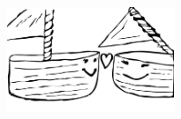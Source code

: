 \sclearpage

\sclearpage

\sclearpage

\sclearpage

\begin{intersong}
	\begin{center}
		\includegraphics[width=5cm]{../bilder/fardigabilder/Batlat.png} 
	\end{center}
\end{intersong}
\sclearpage

\sclearpage